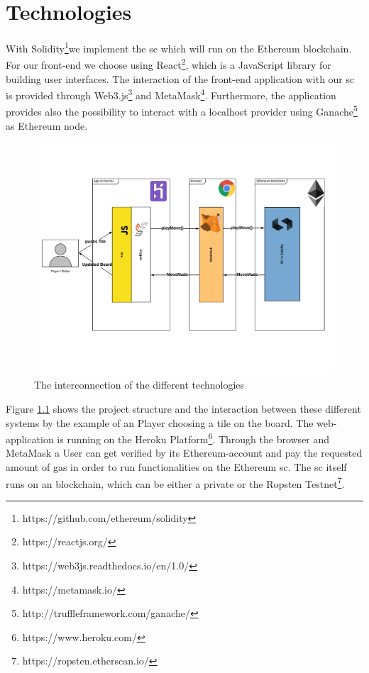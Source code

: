 \chapter{Technologies}\label{ch:technologies}
With Solidity\footnote{https://github.com/ethereum/solidity}we implement the \ac{sc} which will run on the Ethereum blockchain. For our front-end we choose using React\footnote{https://reactjs.org/}, which is a JavaScript library for building user interfaces. The interaction of the front-end application with our \ac{sc} is provided through Web3.js\footnote{https://web3js.readthedocs.io/en/1.0/} and MetaMask\footnote{https://metamask.io/}. Furthermore, the application provides also the possibility to interact with a localhost provider using Ganache\footnote{http://truffleframework.com/ganache/} as Ethereum node.
\begin{figure}[ht]
	\begin{center}
		\includegraphics[scale=0.4]{res/project_structure}
	\end{center}
	\caption{The interconnection of the different technologies}
	\label{fig:interconnection}
\end{figure}\newpage
\noindent Figure \ref{fig:interconnection} shows the project structure and the interaction between these different systems by the example of an Player choosing a tile on the board.
The web-application is running on the Heroku Platform\footnote{https://www.heroku.com/}. Through the browser and MetaMask a User can get verified by its Ethereum-account and pay the requested amount of gas in order to run functionalities on the Ethereum \ac{sc}. The \ac{sc} itself runs on an blockchain, which can be either a private or the Ropsten Testnet\footnote{https://ropsten.etherscan.io/}.

